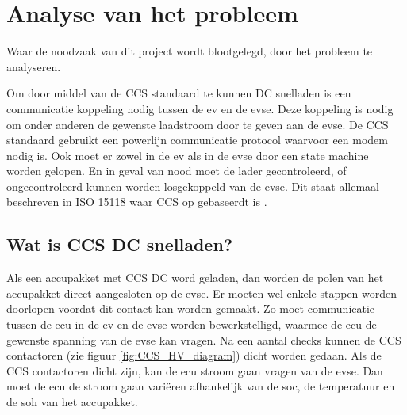 \chapter{Analyse van het probleem}
\label{Analyse_van_het_probleem}

\begin{center}
    \begin{minipage}{0.5\textwidth}
        \begin{small}
            Waar de noodzaak van dit project wordt blootgelegd, door het
            probleem te analyseren.
        \end{small} 
    \end{minipage}
    \vspace{0.5cm}
\end{center}

Om door middel van de CCS standaard te kunnen DC snelladen is een communicatie
koppeling nodig tussen de \ac{ev} en de \ac{evse}. Deze koppeling is nodig om
onder anderen de gewenste laadstroom door te geven aan de \ac{evse}. De CCS
standaard gebruikt een powerlijn communicatie protocol waarvoor een \ac{modem}
nodig is. Ook moet er zowel in de \ac{ev} als in de \ac{evse} door een state
machine worden gelopen. En in geval van nood moet de lader gecontroleerd, of
ongecontroleerd kunnen worden losgekoppeld van de \ac{evse}. Dit staat
allemaal beschreven in ISO 15118 waar CCS op gebaseerdt is \cite{15118}.

\section{Wat is CCS DC snelladen?}

Als een accupakket met CCS DC word geladen, dan worden de polen van het
accupakket direct aangesloten op de \ac{evse}. Er moeten wel enkele stappen
worden doorlopen voordat dit contact kan worden gemaakt. Zo moet communicatie
tussen de \ac{ecu} in de \ac{ev} en de \ac{evse} worden bewerkstelligd, waarmee
de \ac{ecu} de gewenste spanning van de \ac{evse} kan vragen. Na een aantal
checks kunnen de CCS contactoren (zie figuur \ref{fig:CCS_HV_diagram}) dicht
worden gedaan. Als de CCS contactoren dicht zijn, kan de \ac{ecu} stroom gaan
vragen van de \ac{evse}. Dan moet de \ac{ecu} de stroom gaan variëren
afhankelijk van de \ac{soc}, de temperatuur en de \ac{soh} van het accupakket.

